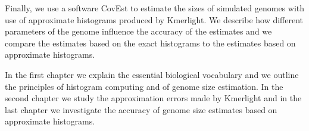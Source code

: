 Finally, we use a software CovEst to estimate the sizes of simulated genomes with use
of approximate histograms produced by Kmerlight. We describe how different parameters of
the genome influence the accuracy of the estimates and we compare the estimates
based on the exact histograms to the estimates based on approximate histograms.

\medskip

In the first chapter we explain the essential biological vocabulary and
we outline the principles of histogram computing and of genome size estimation.
In the second chapter we study the approximation errors made by Kmerlight
and in the last chapter we investigate the accuracy of genome size estimates
based on approximate histograms.
